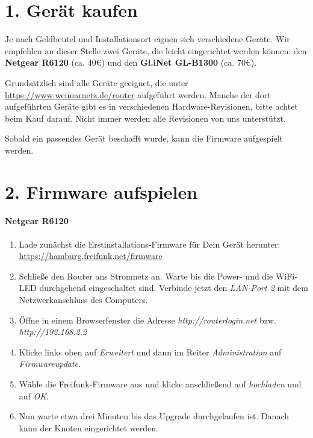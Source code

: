 \documentclass[10pt,a4paper,notumble]{leaflet}
\begin{document}

\section{1. Gerät kaufen}
Je nach Geldbeutel und Installationsort eignen sich verschiedene Geräte. Wir empfehlen an dieser Stelle zwei Geräte, die leicht eingerichtet werden können: den \textbf{Netgear R6120} (ca. 40€) und den \textbf{Gl.iNet GL-B1300} (ca. 70€).

Grundsätzlich sind alle Geräte geeignet, die unter \href{https://www.weimarnetz.de/router}{https://www.weimarnetz.de/router} aufgeführt werden. Manche der dort aufgeführten Geräte gibt es in verschiedenen Hardware-Revisionen, bitte achtet beim Kauf darauf. Nicht immer werden alle Revisionen von uns unterstützt.

Sobald ein passendes Gerät beschafft wurde, kann die Firmware aufgespielt werden.


\newpage


\section{2. Firmware aufspielen}

\paragraph{Netgear R6120}
\begin{enumerate}
 \item Lade zunächst die Erstinstallations-Firmware für Dein Gerät herunter: \href{https://hamburg.freifunk.net/firmware}{https://hamburg.freifunk.net/firmware}
 \item Schließe den Router ans Stromnetz an. Warte bis die Power- und die WiFi-LED durchgehend eingeschaltet sind. Verbinde jetzt den \textit{LAN-Port 2} mit dem Netzwerkanschluss des Computers.
 \item Öffne in einem Browserfenster die Adresse \textit{http://routerlogin.net} bzw. \textit{http://192.168.2.2}
 \item Klicke links oben auf \textit{Erweitert} und dann im Reiter \textit{Administration} auf \textit{Firmwareupdate}.
 \item Wähle die Freifunk-Firmware aus und klicke anschließend auf \textit{hochladen} und auf \textit{OK}.
 \item Nun warte etwa drei Minuten bis das Upgrade durchgelaufen ist. Danach kann der Knoten eingerichtet werden.
\end{enumerate}
\end{document}
